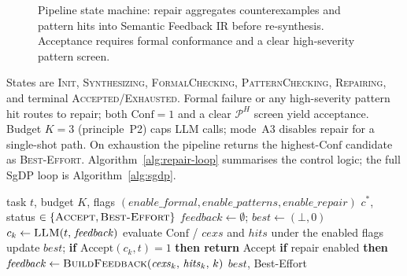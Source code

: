 \begin{figure}[t]
  \centering
  \caption{Pipeline state machine: repair aggregates counterexamples and
           pattern hits into Semantic Feedback IR before re-synthesis.
           Acceptance requires formal conformance and a clear high-severity
           pattern screen.}
  \label{fig:pipeline-state}
\end{figure}

States are \textsc{Init}, \textsc{Synthesizing}, \textsc{FormalChecking},
\textsc{PatternChecking}, \textsc{Repairing}, and terminal
\textsc{Accepted}/\textsc{Exhausted}.
Formal failure or any high-severity pattern hit routes to repair; both
$\mathrm{Conf}=1$ and a clear $\mathcal{P}^H$ screen yield acceptance.
Budget $K{=}3$ (principle~P2) caps LLM calls; mode~A3 disables repair for a
single-shot path.
On exhaustion the pipeline returns the highest-$\mathrm{Conf}$ candidate as
\textsc{Best-Effort}.
Algorithm~\ref{alg:repair-loop} summarises the control logic; the full SgDP
loop is Algorithm~\ref{alg:sgdp}.

\begin{algorithm}[t]
\caption{Counterexample-Guided Repair Loop (sketch)}
\label{alg:repair-loop}
\begin{algorithmic}[1]
\Require task $t$, budget $K$, flags
         $(\mathit{enable\_formal}, \mathit{enable\_patterns}, \mathit{enable\_repair})$
\Ensure $c^*$, status $\in \{\textsc{Accept}, \textsc{Best-Effort}\}$
\State $\mathit{feedback} \leftarrow \emptyset$;\quad
       $\mathit{best} \leftarrow (\bot, 0)$
  \State $c_k \leftarrow \textsc{LLM}(t,\, \mathit{feedback})$
  \State evaluate $\mathrm{Conf}$ / $\mathit{cexs}$ and $\mathit{hits}$
        under the enabled flags
  \State update $\mathit{best}$; \textbf{if}
        $\mathrm{Accept}(c_k,t)=1$ \textbf{then return} Accept
  \State \textbf{if} repair enabled \textbf{then}
        $\mathit{feedback} \leftarrow
        \textsc{BuildFeedback}(\mathit{cexs}_k,\, \mathit{hits}_k,\, k)$
\EndFor
\State \Return $\mathit{best}$, Best-Effort
\end{algorithmic}
\end{algorithm}

